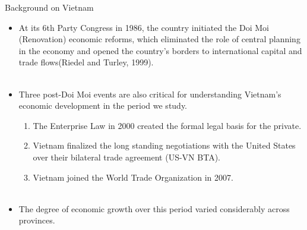 \documentclass{beamer}
\begin{document}
\begin{frame}{Background on Vietnam}

\begin{itemize}
\item At its 6th Party Congress in 1986, the country initiated the Doi Moi (Renovation) economic reforms, which eliminated the role of central planning in the economy and opened the country's borders to international capital and trade flows(Riedel and Turley, 1999).\\~
\item Three post-Doi Moi events are also critical for understanding Vietnam's economic development in the period we study.
\begin{enumerate}
\item The Enterprise Law in 2000 created the formal legal basis for the private.
\item Vietnam finalized the long standing negotiations with the United States over their bilateral trade agreement (US-VN BTA).
\item Vietnam joined the World Trade Organization in 2007.\\~
\end{enumerate}

\item The degree of economic growth over this period varied considerably across provinces.
\end{itemize}

\end{frame}
\end{document}

